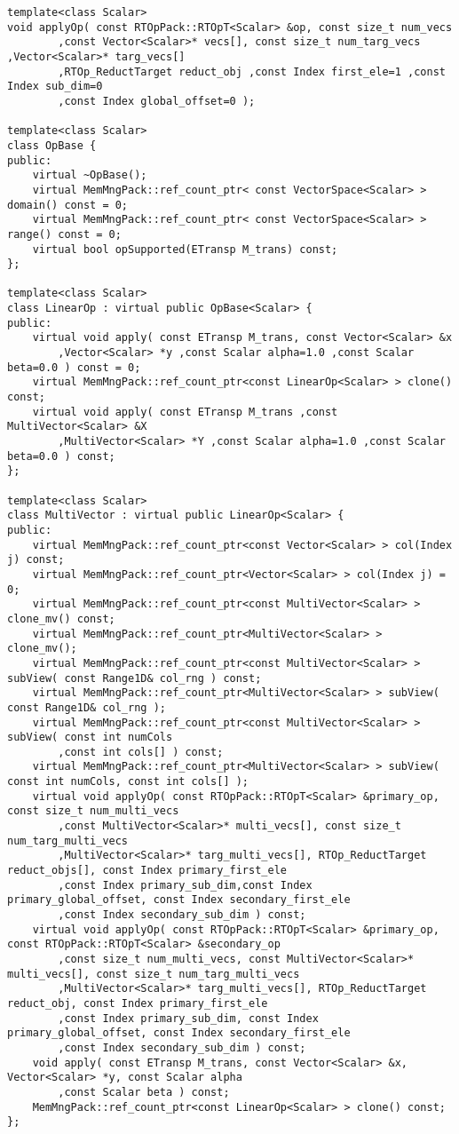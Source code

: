 {\begin{verbatim}
template<class Scalar>
void applyOp( const RTOpPack::RTOpT<Scalar> &op, const size_t num_vecs
        ,const Vector<Scalar>* vecs[], const size_t num_targ_vecs ,Vector<Scalar>* targ_vecs[]
        ,RTOp_ReductTarget reduct_obj ,const Index first_ele=1 ,const Index sub_dim=0
        ,const Index global_offset=0 );

template<class Scalar>
class OpBase {
public:
    virtual ~OpBase();
    virtual MemMngPack::ref_count_ptr< const VectorSpace<Scalar> > domain() const = 0;
    virtual MemMngPack::ref_count_ptr< const VectorSpace<Scalar> > range() const = 0;
    virtual bool opSupported(ETransp M_trans) const;
};

template<class Scalar>
class LinearOp : virtual public OpBase<Scalar> {
public:
    virtual void apply( const ETransp M_trans, const Vector<Scalar> &x
        ,Vector<Scalar> *y ,const Scalar alpha=1.0 ,const Scalar beta=0.0 ) const = 0;
    virtual MemMngPack::ref_count_ptr<const LinearOp<Scalar> > clone() const;
    virtual void apply( const ETransp M_trans ,const MultiVector<Scalar> &X
        ,MultiVector<Scalar> *Y ,const Scalar alpha=1.0 ,const Scalar beta=0.0 ) const;
};

template<class Scalar>
class MultiVector : virtual public LinearOp<Scalar> {
public:
    virtual MemMngPack::ref_count_ptr<const Vector<Scalar> > col(Index j) const;
    virtual MemMngPack::ref_count_ptr<Vector<Scalar> > col(Index j) = 0;
    virtual MemMngPack::ref_count_ptr<const MultiVector<Scalar> > clone_mv() const;
    virtual MemMngPack::ref_count_ptr<MultiVector<Scalar> > clone_mv();
    virtual MemMngPack::ref_count_ptr<const MultiVector<Scalar> > subView( const Range1D& col_rng ) const;
    virtual MemMngPack::ref_count_ptr<MultiVector<Scalar> > subView( const Range1D& col_rng );
    virtual MemMngPack::ref_count_ptr<const MultiVector<Scalar> > subView( const int numCols
        ,const int cols[] ) const;
    virtual MemMngPack::ref_count_ptr<MultiVector<Scalar> > subView( const int numCols, const int cols[] );
    virtual void applyOp( const RTOpPack::RTOpT<Scalar> &primary_op, const size_t num_multi_vecs
        ,const MultiVector<Scalar>* multi_vecs[], const size_t num_targ_multi_vecs
        ,MultiVector<Scalar>* targ_multi_vecs[], RTOp_ReductTarget reduct_objs[], const Index primary_first_ele
        ,const Index primary_sub_dim,const Index primary_global_offset, const Index secondary_first_ele
        ,const Index secondary_sub_dim ) const;
    virtual void applyOp( const RTOpPack::RTOpT<Scalar> &primary_op, const RTOpPack::RTOpT<Scalar> &secondary_op
        ,const size_t num_multi_vecs, const MultiVector<Scalar>* multi_vecs[], const size_t num_targ_multi_vecs
        ,MultiVector<Scalar>* targ_multi_vecs[], RTOp_ReductTarget reduct_obj, const Index primary_first_ele
        ,const Index primary_sub_dim, const Index primary_global_offset, const Index secondary_first_ele
        ,const Index secondary_sub_dim ) const;
    void apply( const ETransp M_trans, const Vector<Scalar> &x, Vector<Scalar> *y, const Scalar alpha
        ,const Scalar beta ) const;
    MemMngPack::ref_count_ptr<const LinearOp<Scalar> > clone() const;
};


\end{verbatim}}
